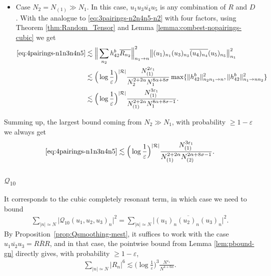 \documentclass[11pt, xcolor = dvipsnames,reqno
]{amsart}
\theoremstyle{definition}
\theoremstyle{remark}
\begin{document}
\begin{itemize}
   
        \item Case $N_2 = N_{(1)} \gg N_1$. In this case, $u_1 u_3 \overline{u_4} u_5$ is any combination of $R$ and $D$. With the analogue to \eqref{eq:3pairings-n2n4n5-n2} with four factors, using  Theorem \ref{thm:Random_Tensor} and Lemma \ref{lemma:combest-nopairings-cubic} we get
        \begin{align*}
            \eqref{eq:4pairings-n1n3n4n5} & \lesssim \Big\|\sum_{n_2} h^b_{42} \overline{R_{n_2}} \Big\|_{n_1 \rightarrow n}^2 \big\|(u_1)_{n_1} (u_3)_{n_3} \overline{(u_4)_{n_4}} (u_5)_{n_5} \big\|_{n_1}^2 \\
            &\lesssim \Big( \log \frac{1}{\varepsilon} \Big)^{|\mathcal{R}|} \frac{N_{(1)}^{2\varepsilon_1}}{N_2^{2 + 2\alpha} N_1^{8\alpha + 8 \sigma}} \max\{ \| h^b_{42} \|_{n_2n_1 \rightarrow n}^2 , \| h^b_{42} \|_{n_1 \rightarrow nn_2}^2 \} \\
            &\lesssim \Big( \log \frac{1}{\varepsilon} \Big)^{|\mathcal{R}|} \frac{N_{(1)}^{3\varepsilon_1}}{N_{(1)}^{2 + 2\alpha} N_1^{8 \alpha + 8\sigma - 1}}.
        \end{align*}
    \end{itemize}
    Summing up, the largest bound coming from $N_2 \gg N_1$, with probability $\geq 1 - \varepsilon$ we always get 
    \begin{equation}
        \eqref{eq:4pairings-n1n3n4n5} 
        \lesssim \Big( \log \frac{1}{\varepsilon} \Big)^{|\mathcal R|}  \frac{N_{(1)}^{3\varepsilon_1}}{N_{(1)}^{2 + 2\alpha} N_{(2)}^{2\alpha + 8\sigma - 1 }}.
    \end{equation} 

    \subsubsection{$\mathcal Q_{10}$}
    It corresponds to the cubic completely resonant term, in which case we need to bound
    \begin{align}
        \sum_{|n| \simeq N}  \big| \mathcal{Q}_{10}(u_1, u_2, u_3)_n \big|^2
        = \sum_{|n| \simeq N} \big|(u_1)_n \overline{(u_2)_n} (u_3)_n \big|^2.
    \end{align} 
    By Proposition~\ref{prop:Qsmoothing-mest}, 
    it suffices to work with the case $u_1\overline{u_2} u_3 = R \overline R R$, and in that case, the pointwise bound from Lemma \ref{lem:pbound-gn} directly gives, with probability $\geq 1 - \varepsilon$,
    \begin{align}
        \sum_{|n| \simeq N} |R_n|^6
        \lesssim \Big( \log \frac{1}{\varepsilon} \Big)^3 \frac{N^{\varepsilon_1}}{N^{4+6\alpha}}.
    \end{align} 
\end{document}
